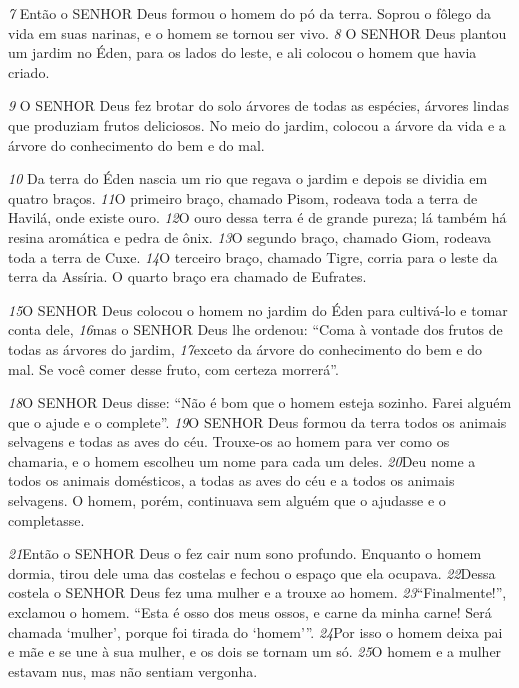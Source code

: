 \bigskip
\textit{\tiny 7}
Então o SENHOR Deus formou o homem do pó da
terra. Soprou o fôlego da vida em suas narinas, e o homem se tornou ser vivo.
\textit{\tiny 8}
O SENHOR Deus plantou um jardim no Éden, para os lados do leste, e ali
colocou o homem que havia criado. 

\bigskip
\textit{\tiny 9}
O SENHOR Deus fez brotar do solo árvores de
todas as espécies, árvores lindas que produziam frutos deliciosos. No meio do
jardim, colocou a árvore da vida e a árvore do conhecimento do bem e do mal.

\bigskip
\textit{\tiny 10}
Da terra do Éden nascia um rio que regava o jardim e depois se dividia em
quatro braços.  
\textit{\tiny 11}O primeiro braço, chamado Pisom, rodeava toda a terra de
Havilá, onde existe ouro.  
\textit{\tiny 12}O ouro dessa terra é de grande pureza; lá também há
resina aromática e pedra de ônix.  
\textit{\tiny 13}O segundo braço, chamado Giom, rodeava
toda a terra de Cuxe. 
\textit{\tiny 14}O terceiro braço, chamado Tigre, corria para o leste da
terra da Assíria. O quarto braço era chamado de Eufrates.

\bigskip
\textit{\tiny 15}O SENHOR Deus colocou o homem no jardim do Éden para cultivá-lo e tomar
conta dele,  
\textit{\tiny 16}mas o SENHOR Deus lhe ordenou: “Coma à vontade dos frutos de
todas as árvores do jardim,  
\textit{\tiny 17}exceto da árvore do conhecimento do bem e do mal.
Se você comer desse fruto, com certeza morrerá”.

\bigskip
\textit{\tiny 18}O SENHOR Deus disse: “Não é bom que o homem esteja sozinho. Farei alguém
que o ajude e o complete”.  
\textit{\tiny 19}O SENHOR Deus formou da terra todos os animais
selvagens e todas as aves do céu. Trouxe-os ao homem para ver como os
chamaria, e o homem escolheu um nome para cada um deles.  
\textit{\tiny 20}Deu nome a todos
os animais domésticos, a todas as aves do céu e a todos os animais selvagens. O
homem, porém, continuava sem alguém que o ajudasse e o completasse.

\bigskip
\textit{\tiny 21}Então o SENHOR Deus o fez cair num sono profundo. Enquanto o homem
dormia, tirou dele uma das costelas e fechou o espaço que ela ocupava.  
\textit{\tiny 22}Dessa
costela o SENHOR Deus fez uma mulher e a trouxe ao homem.
\textit{\tiny 23}“Finalmente!”, exclamou o homem.
“Esta é osso dos meus ossos,
      e carne da minha carne!
    Será chamada ‘mulher’,
      porque foi tirada do ‘homem’”.
\textit{\tiny 24}Por   isso o homem deixa pai e mãe e se une à sua mulher, e os dois se tornam
um só.
\textit{\tiny 25}O homem e a mulher estavam nus, mas não sentiam vergonha.

